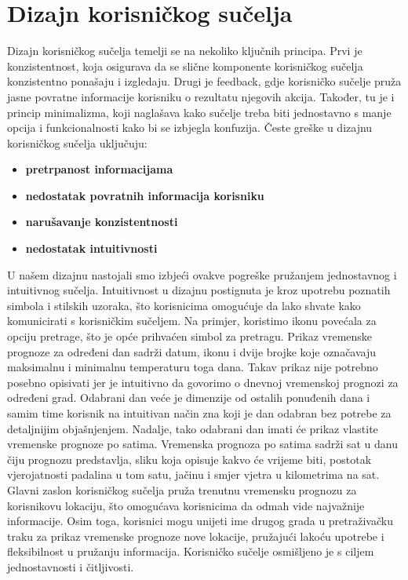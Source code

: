 \documentclass[times, utf8, zavrsni]{fer}
\begin{document}
\section{Dizajn korisničkog sučelja}
Dizajn korisničkog sučelja temelji se na nekoliko ključnih principa. Prvi je konzistentnost, koja osigurava da se slične komponente korisničkog sučelja konzistentno ponašaju i izgledaju. Drugi je feedback, gdje korisničko sučelje pruža jasne povratne informacije korisniku o rezultatu njegovih akcija. Također, tu je i princip minimalizma, koji naglašava kako sučelje treba biti jednostavno s manje opcija i funkcionalnosti kako bi se izbjegla konfuzija. Česte greške u dizajnu korisničkog sučelja uključuju:
\begin{itemize}
    \item \textbf{pretrpanost informacijama}
    \item \textbf{nedostatak povratnih informacija korisniku}
    \item \textbf{narušavanje konzistentnosti}
    \item \textbf{nedostatak intuitivnosti}
\end{itemize}
U našem dizajnu nastojali smo izbjeći ovakve pogreške pružanjem jednostavnog i intuitivnog sučelja. Intuitivnost u dizajnu postignuta je kroz upotrebu poznatih simbola i stilskih uzoraka, što korisnicima omogućuje da lako shvate kako komunicirati s korisničkim sučeljem. Na primjer, koristimo ikonu povećala za opciju pretrage, što je opće prihvaćen simbol za pretragu. Prikaz vremenske prognoze za određeni dan sadrži datum, ikonu i dvije brojke koje označavaju maksimalnu i minimalnu temperaturu toga dana. Takav prikaz nije potrebno posebno opisivati jer je intuitivno da govorimo o dnevnoj vremenskoj prognozi za određeni grad. Odabrani dan veće je dimenzije od ostalih ponuđenih dana i samim time korisnik na intuitivan način zna koji je dan odabran bez potrebe za detaljnijim objašnjenjem. Nadalje, tako odabrani dan imati će prikaz vlastite vremenske prognoze po satima. Vremenska prognoza po satima sadrži sat u danu čiju prognozu predstavlja, sliku koja opisuje kakvo će vrijeme biti, postotak vjerojatnosti padalina u tom satu, jačinu i smjer vjetra u kilometrima na sat. Glavni zaslon korisničkog sučelja pruža trenutnu vremensku prognozu za korisnikovu lokaciju, što omogućava korisnicima da odmah vide najvažnije informacije. Osim toga, korisnici mogu unijeti ime drugog grada u pretraživačku traku za prikaz vremenske prognoze nove lokacije, pružajući lakoću upotrebe i fleksibilnost u pružanju informacija. Korisničko sučelje osmišljeno je s ciljem jednostavnosti i čitljivosti.
\end{document}
